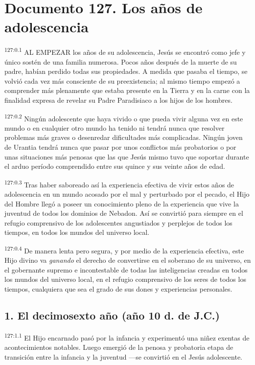 \chapter{Documento 127. Los años de adolescencia}
\par 
\textsuperscript{127:0.1} AL EMPEZAR los años de su adolescencia, Jesús se encontró como jefe y único sostén de una familia numerosa. Pocos años después de la muerte de su padre, habían perdido todas sus propiedades. A medida que pasaba el tiempo, se volvió cada vez más consciente de su preexistencia; al mismo tiempo empezó a comprender más plenamente que estaba presente en la Tierra y en la carne con la finalidad expresa de revelar su Padre Paradisiaco a los hijos de los hombres.

\par 
\textsuperscript{127:0.2} Ningún adolescente que haya vivido o que pueda vivir alguna vez en este mundo o en cualquier otro mundo ha tenido ni tendrá nunca que resolver problemas más graves o desenredar dificultades más complicadas. Ningún joven de Urantia tendrá nunca que pasar por unos conflictos más probatorios o por unas situaciones más penosas que las que Jesús mismo tuvo que soportar durante el arduo período comprendido entre sus quince y sus veinte años de edad.

\par 
\textsuperscript{127:0.3} Tras haber saboreado así la experiencia efectiva de vivir estos años de adolescencia en un mundo acosado por el mal y perturbado por el pecado, el Hijo del Hombre llegó a poseer un conocimiento pleno de la experiencia que vive la juventud de todos los dominios de Nebadon. Así se convirtió para siempre en el refugio comprensivo de los adolescentes angustiados y perplejos de todos los tiempos, en todos los mundos del universo local.

\par 
\textsuperscript{127:0.4} De manera lenta pero segura, y por medio de la experiencia efectiva, este Hijo divino va \textit{ganando} el derecho de convertirse en el soberano de su universo, en el gobernante supremo e incontestable de todas las inteligencias creadas en todos los mundos del universo local, en el refugio comprensivo de los seres de todos los tiempos, cualquiera que sea el grado de sus dones y experiencias personales.

\section*{1. El decimosexto año (año 10 d. de J.C.)}
\par 
\textsuperscript{127:1.1} El Hijo encarnado pasó por la infancia y experimentó una niñez exentas de acontecimientos notables. Luego emergió de la penosa y probatoria etapa de transición entre la infancia y la juventud ---se convirtió en el Jesús adolescente.

